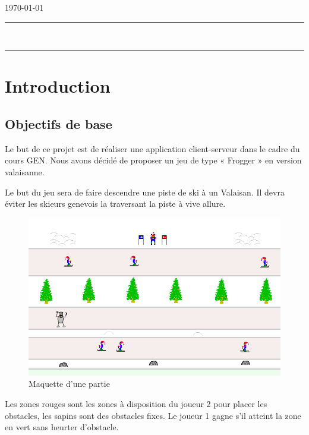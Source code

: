 \documentclass[a4paper,11pt]{article}
\author{\auteur}
\title{\titre}
\date{\today}
\begin{document}
	\thispagestyle{empty}
	\noindent \cours \hfill \ecole{} \newline
	\noindent \auteur \hfill \today \newline
	\hrule
	\vspace{7mm}
	\noindent {\large \bf \domaine } \hfill \titre {\large \bf }\\[3mm]
	\hrule

	\tableofcontents

	\newpage

	\section{Introduction}
	\subsection{Objectifs de base}
	Le but de ce projet est de réaliser une application client-serveur dans le cadre du cours GEN. Nous avons décidé de proposer un jeu de type « Frogger » en version valaisanne. \par

	Le but du jeu sera de faire descendre une piste de ski à un Valaisan. Il devra éviter les skieurs genevois la traversant la piste à vive allure.

	\begin{figure}[h!]
		\centering
		\includegraphics[scale=0.7]{../Screenshots/demo.png}		\caption{Maquette d'une partie}
		\label{fig:maquette}
	\end{figure}

	Les zones rouges sont les zones à disposition du joueur 2 pour placer les obstacles, les sapins sont des obstacles fixes. Le joueur 1 gagne s'il atteint la zone en vert sans heurter d'obstacle.
\end{document}

